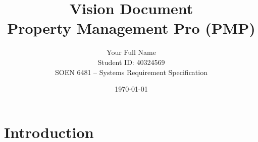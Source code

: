 \documentclass[12pt]{article}
\title{Vision Document\\\large Property Management Pro (PMP)}
\author{Your Full Name \\ Student ID: 40324569 \\ SOEN 6481 -- Systems Requirement Specification}
\date{\today}
\begin{document}
\maketitle
\tableofcontents
\newpage

\section{Introduction}
\end{document}
